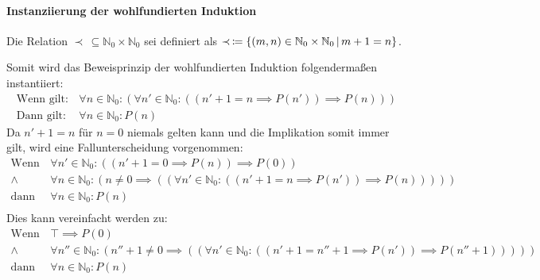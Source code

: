																\paragraph{Instanziierung der wohlfundierten Induktion}
																	Die Relation $ \prec \,\subseteq \mathbb{N} _ 0 \times \mathbb{N} _ 0 $ sei definiert als $ \prec \,\coloneqq \{ (m, n) \in \mathbb{N} _ 0 \times \mathbb{N} _ 0 \,\vert\, m + 1 = n \} $.

																	Somit wird das Beweisprinzip der wohlfundierten Induktion folgendermaßen instantiiert:
																	\begin{align*}
																		\text{Wenn gilt:} & \,\forall n \in \mathbb{N} _ 0 : (\forall n' \in \mathbb{N} _ 0 : ((n' + 1 = n \implies P(n')) \implies P(n))) \\
																		\text{Dann gilt:} & \,\forall n \in \mathbb{N} _ 0 : P(n)
																	\end{align*}
																	Da $ n' + 1 = n $ für $ n = 0 $ niemals gelten kann und die Implikation somit immer gilt, wird eine Fallunterscheidung vorgenommen:
																	\begin{align*}
																		\text{Wenn gilt:} & \,\forall n' \in \mathbb{N} _ 0 : ((n' + 1 = 0 \implies P(n)) \implies P(0))                                                         \\
																		\land             & \,\forall n \in \mathbb{N} _ 0 : (n \neq 0 \implies ((\forall n' \in \mathbb{N} _ 0 : ((n' + 1 = n \implies P(n')) \implies P(n))))) \\
																		\text{dann gilt:} & \,\forall n \in \mathbb{N} _ 0 : P(n)                                                                                                \\
																	\end{align*}
																	Dies kann vereinfacht werden zu:
																	\begin{align*}
																		\text{Wenn gilt:} & \,\top \implies P(0)                                                                                                                                     \\
																		\land             & \,\forall n'' \in \mathbb{N} _ 0 : (n'' + 1 \neq 0 \implies ((\forall n' \in \mathbb{N} _ 0 : ((n' + 1 = n'' + 1 \implies P(n')) \implies P(n'' + 1))))) \\
																		\text{dann gilt:} & \,\forall n \in \mathbb{N} _ 0 : P(n)                                                                                                                    \\
																	\end{align*}
